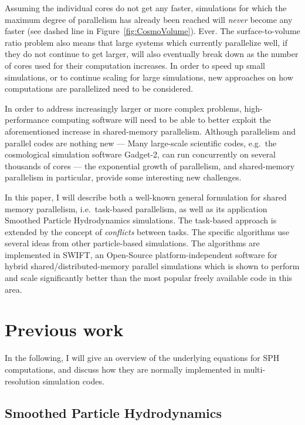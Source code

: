 \documentclass[final]{siamltex}
\newcommand{\fig}[1]
    {Figure~\ref{fig:#1}}
\begin{document}
Assuming the individual cores do not get any faster,
simulations for which the
maximum degree of parallelism has already been reached will
{\em never} become any faster (see dashed line in \fig{CosmoVolume}).
Ever.
The surface-to-volume ratio problem also means that large
systems which currently parallelize well, if they do not continue
to get larger, will also eventually break down as the number
of cores used for their computation increases.
In order to speed up small simulations, or to continue
scaling for large simulations, new approaches on how
computations are parallelized need to be considered.

In order to address increasingly larger
or more complex problems, high-performance computing software
will need to be able to better exploit the aforementioned increase
in shared-memory parallelism.
Although parallelism and parallel codes are nothing new ---
Many large-scale scientific codes, e.g.~the cosmological
simulation software Gadget-2, can run concurrently
on several thousands of cores ---
the exponential growth of parallelism, and shared-memory
parallelism in particular, provide some interesting 
new challenges.

In this paper, I will describe both a well-known general formulation
for shared memory parallelism, i.e.~task-based parallelism, as well
as its application Smoothed Particle Hydrodynamics simulations.
The task-based approach is extended by the concept of {\em conflicts}
between tasks.
The specific algorithms use several ideas from other particle-based
simulations.
The algorithms are implemented in SWIFT, an Open-Source
platform-independent software for hybrid shared/distributed-memory
parallel simulations which is shown to perform and scale
significantly better than the most popular freely available code
in this area.


\section{Previous work}

In the following, I will give an overview of the underlying equations for
SPH computations, and discuss how they are normally implemented
in multi-resolution simulation codes.


\subsection{Smoothed Particle Hydrodynamics}
\end{document}
